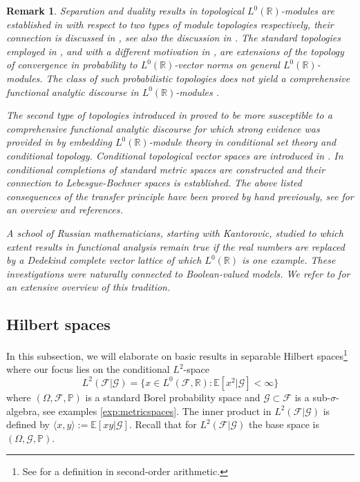 \documentclass{jloganal}
\numberwithin{equation}{section}
\theoremstyle{plain}
\newtheorem{remark}[subsection]{Remark}
\renewcommand\R{\mathbb{R}}
\begin{document}
\begin{remark}
Separation and duality results in topological $L^0(\R)$-modules are established in \cite{guo2009separation,filipovic2009separation} with respect to two types of module topologies respectively, their connection is discussed in \cite{guo2010relations}, see also the discussion in \cite{jamneshan2017compact}.   
The standard topologies employed in \cite{guo2009separation}, and with a different motivation in \cite{haydon1991randomly}, are extensions of the topology of convergence in probability to $L^0(\mathbb{R})$-vector norms on general $L^0(\mathbb{R})$-modules. 
The class of such probabilistic topologies does not yield a comprehensive functional analytic discourse in $L^0(\R)$-modules \cite{jamneshan2017compact}. 
  
The second type of topologies introduced in \cite{filipovic2009separation} proved to be more susceptible to a comprehensive functional analytic discourse for which strong evidence was provided in \cite{drapeau2016algebra} by embedding $L^0(\R)$-module theory in  conditional set theory and conditional topology.  
Conditional topological vector spaces are introduced in \cite[Section 5]{drapeau2016algebra}. 
In \cite{DJK16} conditional completions of standard metric spaces are constructed and their connection to Lebesgue-Bochner spaces is established. 
The above listed consequences of the transfer principle have been proved by hand previously, see \cite{jamneshan2017compact} for an overview and references.  

A school of Russian mathematicians, starting with Kantorovic, studied to which extent results in functional analysis remain true if the real numbers are replaced by a Dedekind complete vector lattice of which $L^0(\mathbb{R})$ is one example. 
These investigations were naturally connected to Boolean-valued models. 
We refer to \cite{kusraev2012boolean,kutateladze2012nonstandard} for an extensive overview of this tradition. 
\end{remark}


\subsection{Hilbert spaces} 

In this subsection, we will elaborate on basic results in separable Hilbert spaces\footnote{See \cite[Definition 9.3]{avigad2006fundamental} for a definition in second-order arithmetic.} where our focus lies on the conditional $L^2$-space 
\[
L^2(\mathcal{F}|\mathcal{G})=\{x\in L^0(\mathcal{F},\R)\colon \mathbb{E}[x^2|\mathcal{G}]<\infty\} 
\]
where $(\Omega,\mathcal{F},\mathbb{P})$ is a standard Borel probability space and $\mathcal{G}\subset \mathcal{F}$ is a sub-$\sigma$-algebra, see examples \ref{exp:metricspaces}. 
The inner product in $L^2(\mathcal{F}|\mathcal{G})$ is defined by $\langle x,y\rangle:= \mathbb{E}[xy|\mathcal{G}]$.  
Recall that for $L^2(\mathcal{F}|\mathcal{G})$ the base space is $(\Omega,\mathcal{G},\mathbb{P})$.  
\end{document}
